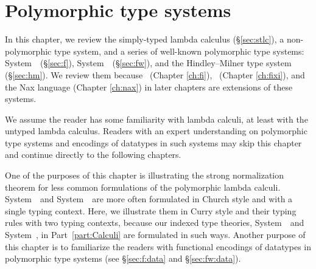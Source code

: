\chapter{Polymorphic type systems}\label{ch:poly}
In this chapter, we review the simply-typed lambda calculus (\S\ref{sec:stlc}),
a non-polymorphic type system, and
a series of well-known polymorphic type systems:
System~\F\ (\S\ref{sec:f}), System~\Fw\ (\S\ref{sec:fw}),
and the Hindley--Milner type system (\S\ref{sec:hm}).
We review them because \Fi\ (Chapter \ref{ch:fi}),
\Fixi\ (Chapter \ref{ch:fixi}), and the Nax language (Chapter \ref{ch:nax})
in later chapters are extensions of these systems.

We assume the reader has some familiarity with lambda calculi, at least
with the untyped lambda calculus. Readers with an expert understanding on
polymorphic type systems and encodings of datatypes in such systems
may skip this chapter and continue directly to the following chapters.

One of the purposes of this chapter is illustrating
the strong normalization theorem for less common formulations of
the polymorphic lambda calculi. System~\F\ and System~\Fw\ are more often
formulated in Church style and with a single typing context. Here,
we illustrate them in Curry style and their typing rules with two
typing contexts, because our indexed type theories, System~\Fi\ and
System~\Fixi, in Part~\ref{part:Calculi} are formulated in such ways.
Another purpose of this chapter is to familiarize the readers with
functional encodings of datatypes in polymorphic type systems
(see \S\ref{sec:f:data} and \S\ref{sec:fw:data}).


